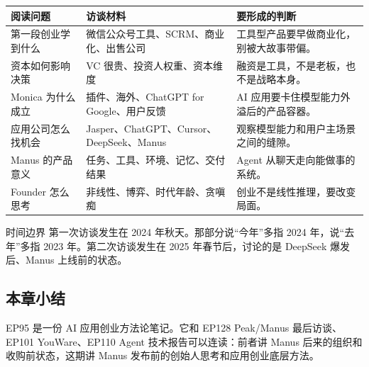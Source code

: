 \noindent\begin{tabularx}{\textwidth}{p{}p{}X}
\toprule
阅读问题 & 访谈材料 & 要形成的判断 \\
\midrule
第一段创业学到什么 & 微信公众号工具、SCRM、商业化、出售公司 & 工具型产品要早做商业化，别被大故事带偏。 \\
资本如何影响决策 & VC 很贵、投资人权重、资本维度 & 融资是工具，不是老板，也不是战略本身。 \\
Monica 为什么成立 & 插件、海外、ChatGPT for Google、用户反馈 & AI 应用要卡住模型能力外溢后的产品容器。 \\
应用公司怎么找机会 & Jasper、ChatGPT、Cursor、DeepSeek、Manus & 观察模型能力和用户主场景之间的缝隙。 \\
Manus 的产品意义 & 任务、工具、环境、记忆、交付结果 & Agent 从聊天走向能做事的系统。 \\
Founder 怎么思考 & 非线性、博弈、时代年龄、贪嗔痴 & 创业不是线性推理，要改变局面。 \\
\bottomrule
\end{tabularx}

\begin{warningbox}{时间边界}
第一次访谈发生在 2024 年秋天。那部分说“今年”多指 2024 年，说“去年”多指 2023 年。第二次访谈发生在 2025 年春节后，讨论的是 DeepSeek 爆发后、Manus 上线前的状态。
\end{warningbox}

\subsection{本章小结}

EP95 是一份 AI 应用创业方法论笔记。它和 EP128 Peak/Manus 最后访谈、EP101 YouWare、EP110 Agent 技术报告可以连读：前者讲 Manus 后来的组织和收购前状态，这期讲 Manus 发布前的创始人思考和应用创业底层方法。


